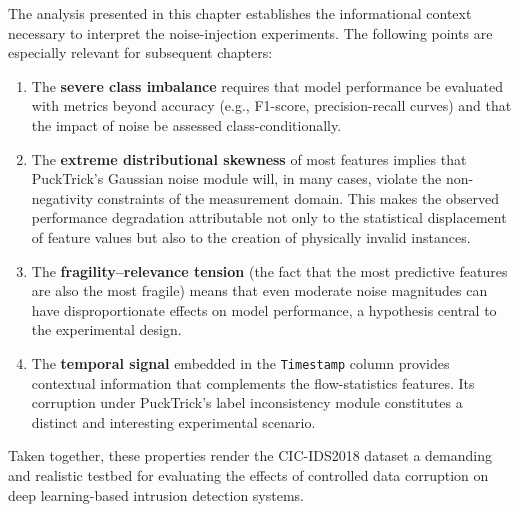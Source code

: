 \documentclass[../main.tex]{subfiles}
\begin{document}
The analysis presented in this chapter establishes the informational context
necessary to interpret the noise-injection experiments.  The following points
are especially relevant for subsequent chapters:

\begin{enumerate}
  \item The \textbf{severe class imbalance} requires that model performance be
        evaluated with metrics beyond accuracy (e.g., F1-score,
        precision-recall curves) and that the impact of noise be assessed
        class-conditionally.
  \item The \textbf{extreme distributional skewness} of most features implies
        that PuckTrick's Gaussian noise module will, in many cases, violate
        the non-negativity constraints of the measurement domain.  This makes
        the observed performance degradation attributable not only to the
        statistical displacement of feature values but also to the creation of
        physically invalid instances.
  \item The \textbf{fragility–relevance tension} (the fact that the most
        predictive features are also the most fragile) means that even
        moderate noise magnitudes can have disproportionate effects on model
        performance, a hypothesis central to the experimental design.
  \item The \textbf{temporal signal} embedded in the \texttt{Timestamp}
        column provides contextual information that complements the
        flow-statistics features.  Its corruption under PuckTrick's label
        inconsistency module constitutes a distinct and interesting experimental
        scenario.
\end{enumerate}

Taken together, these properties render the CIC-IDS2018 dataset a demanding and
realistic testbed for evaluating the effects of controlled data corruption on
deep learning-based intrusion detection systems.
\end{document}
